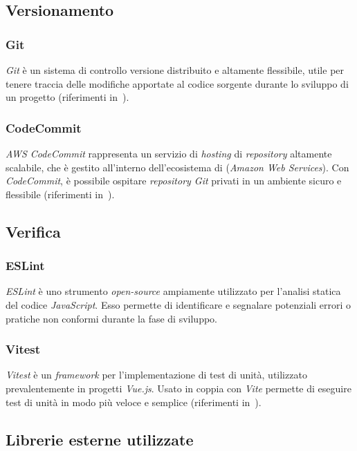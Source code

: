 \subsection{Versionamento}\label{subsec:versionamento}
\subsubsection{Git}\label{subsubsec:git}
\textit{Git} è un sistema di controllo versione distribuito e altamente flessibile, utile per tenere traccia delle modifiche apportate al codice sorgente durante lo sviluppo di un progetto  (riferimenti in~\cite{site:git}).
\subsubsection{CodeCommit}\label{subsubsec:code-commit}
\textit{AWS CodeCommit} rappresenta un servizio di \textit{hosting} di \textit{repository} altamente scalabile, che è gestito all'interno dell'ecosistema di  (\textit{Amazon Web Services}). 
Con \textit{CodeCommit}, è possibile ospitare \textit{repository Git} privati in un ambiente sicuro e flessibile (riferimenti in~\cite{site:code-commit}).

\subsection{Verifica}\label{subsec:verifica}
\subsubsection{ESLint}\label{subsubsec:eslint}
\textit{ESLint} è uno strumento \textit{open-source} ampiamente utilizzato per l'analisi statica del codice \textit{JavaScript}. Esso permette di identificare e segnalare potenziali errori o pratiche non conformi durante la fase di sviluppo.
\subsubsection{Vitest}\label{subsubsec:vitest}
\textit{Vitest} è un \textit{framework} per l'implementazione di test di unità, utilizzato prevalentemente in progetti \textit{Vue.js}.
Usato in coppia con \textit{Vite} permette di eseguire test di unità in modo più veloce e semplice (riferimenti in~\cite{site:vitest}).

\subsection{Librerie esterne utilizzate}\label{subsec:librerie-esterne}
